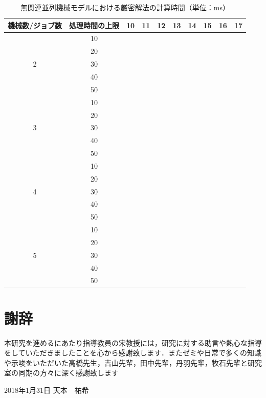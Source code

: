 \documentclass[12pt]{optlab-bachelor}
\def\氏名{天本　祐希}
\begin{document}
\begin{table}[htb]
  \setlength{\leftskip}{-15mm}
  \begin{tabular}{|c|c|c|c|c|c|c|c|c|c|} \hline
    機械数/ジョブ数 & 処理時間の上限 & 10 & 11 & 12 & 13 & 14 & 15 & 16 & 17 \\ \hline \hline
    & 10 &  &  &  &  &  &  &  &  \\ \cline{2-10}
    & 20 &  &  &  &  &  &  &  &  \\ \cline{2-10}
    2 & 30 &  &  &  &  &  &  &  &  \\ \cline{2-10}
    & 40 &  &  &  &  &  &  &  &  \\ \cline{2-10}
    & 50 &  &  &  &  &  &  &  &  \\ \hline \hline
    & 10 &  &  &  &  &  &  &  &  \\ \cline{2-10}
    & 20 &  &  &  &  &  &  &  &  \\ \cline{2-10}
    3 & 30 &  &  &  &  &  &  &  &  \\ \cline{2-10}
    & 40 &  &  &  &  &  &  &  &  \\ \cline{2-10}
    & 50 &  &  &  &  &  &  &  &  \\ \hline \hline
    & 10 &  &  &  &  &  &  &  & \\ \cline{2-10}
    & 20 &  &  &  &  &  &  &  &  \\ \cline{2-10}
    4 & 30 &  &  &  &  &  &  &  &  \\ \cline{2-10}
    & 40 &  &  &  &  &  &  &  &  \\ \cline{2-10}
    & 50 &  &  &  &  &  &  &  &  \\ \hline \hline
    & 10 &  &  &  &  &  &  &  &  \\ \cline{2-10}
    & 20 &  &  &  &  &  &  &  &  \\ \cline{2-10}
    5 & 30 &  &  &  &  &  &  &  &  \\ \cline{2-10}
    & 40 &  &  &  &  &  &  &  &  \\ \cline{2-10}
    & 50 &  &  &  &  &  &  &  &  \\ \hline \hline
  \end{tabular}
  \caption{無関連並列機械モデルにおける厳密解法の計算時間（単位：ms）}
\end{table}






\chapter*{謝辞}
本研究を進めるにあたり指導教員の宋教授には，研究に対する助言や熱心な指導をしていただきましたことを心から感謝致します．またゼミや日常で多くの知識や示唆をいただいた高橋先生，吉山先輩，田中先輩，丹羽先輩，牧石先輩と研究室の同期の方々に深く感謝致します

\begin{flushright}
  2018年1月31日 \氏名
\end{flushright}
\endmatter
\end{document}
